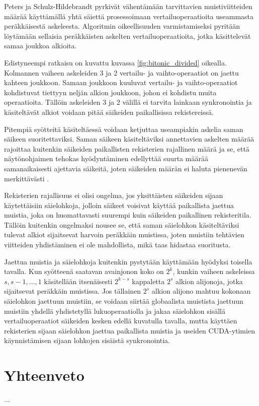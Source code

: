 \documentclass[a4paper,11pt]{article}
\begin{document}
Peters ja Schulz-Hildebrandt \cite{peters2012gems} pyrkivät vähentämään tarvittavien muistiviitteiden määrää käyttämällä yhtä säiettä prosessoimaan vertailuoperaatioita useammasta peräkkäisestä askeleesta. Algoritmin oikeellisuuden varmistamiseksi pyritään löytämään sellaisia peräkkäisten askelten vertailuoperaatioita, jotka käsittelevät samaa joukkoa alkioita.

Edistyneempi ratkaisu on kuvattu kuvassa \ref{fig:bitonic_divided} oikealla. Kolmannen vaiheen askeleiden 3 ja 2 vertailu- ja vaihto-operaatiot on jaettu kahteen joukkoon. Samaan joukkoon kuuluvat vertailu- ja vaihto-operaatiot kohdistuvat tiettyyn neljän alkion joukkoon, johon ei kohdistu muita operaatioita. Tällöin askeleiden 3 ja 2 välillä ei tarvita lainkaan synkronointia ja käsiteltävät alkiot voidaan pitää säikeiden paikallisissa rekistereissä.

Pitempiä syötteitä käsiteltäessä voidaan ketjuttaa useampiakin askelia saman säikeen suoritettaviksi. Saman säikeen käsiteltäviksi annettavien askelten määrää rajoittaa kuitenkin säikeiden paikallisten rekisterien rajallinen määrä ja se, että näytönohjaimen tehokas hyödyntäminen edellyttää suurta määrää samanaikaisesti ajettavia säikeitä, joten säikeiden määrän ei haluta pienenevän merkittävästi \cite{peters2012gems}.

Rekisterien rajallisuus ei olisi ongelma, jos yksittäisten säikeiden sijaan käytettäisiin säielohkoja, jolloin säikeet voisivat käyttää paikallista jaettua muistia, joka on huomattavasti suurempi kuin säikeiden paikallinen rekisteritila. Tällöin kuitenkin ongelmaksi nousee se, että saman säielohkon käsiteltäviksi tulevat alkiot sijaitsevat harvoin peräkkäin muistissa, joten muistiin tehtävien viitteiden yhdistäminen ei ole mahdollista, mikä taas hidastaa suoritusta.

Jaettua muistia ja säielohkoja kuitenkin pystytään käyttämään hyödyksi toisella tavalla. Kun syötteenä saatavan avainjonon koko on $2^k$, kunkin vaiheen askeleissa $s, s-1, ..., 1$ käsitellään itsenäisesti $2^{k-s}$ kappaletta $2^s$ alkion alijonoja, jotka sijaitsevat peräkkäin muistissa. Jos tällainen $2^s$ alkion alijono mahtuu kokonaan säielohkon jaettuun muistiin, se voidaan siirtää globaalista muistista jaettuun muistiin yhdellä yhdistetyllä lukuoperaatiolla ja jakaa säielohkon sisällä vertailuoperaatiot säikeiden kesken edellä kuvatulla tavalla, mutta käyttäen rekisterien sijaan säielohkon jaettua paikallista muistia ja useiden CUDA-ytimien käynnistämisen sijaan lohkojen sisäistä synkronointia.

\section{Yhteenveto}

...

\printbibliography
\end{document}

